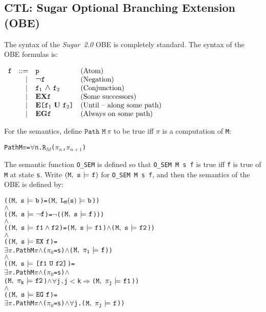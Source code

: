 \documentclass{llncs}
\newcommand{\And}{\(\wedge\)}
\newcommand{\Imp}{\(\Rightarrow\)}
\newcommand{\Not}{\(\neg\)}
\newcommand{\Forall}{\(\forall\)}
\newcommand{\Exists}{\(\exists\)}
\newcommand{\Le}{\(<\)}
\renewcommand{\Pi}{\(\pi\)}
\newcommand{\BSem}[3]{(\(\tt#1,~#2~{\models}~#3\))}
\newcommand{\OSem}[3]{(\(\tt{#1,~#2~{\models}~#3}\))}
\newcommand{\Osem}{\texttt{O\_SEM}\xspace}
\newcommand{\oSem}[3]{(\tt{#1,~#2~{\models}~#3})}
\newcommand{\pathEl}[2]{#1_{#2}}
\newcommand{\PathEl}[2]{\(#1_{#2}\)}
\newcommand{\lNoHat}[1]{{\texttt{L}}_{#1}}
\newcommand{\getR}[1]{\({\texttt{R}}_{#1}\)}
\newcommand{\oBool}[1]{#1}
\newcommand{\oNot}[1]{\neg#1}
\newcommand{\oAnd}[2]{#1\wedge#2}
\newcommand{\oEx}[1]{{\texttt{EX}}~#1}
\newcommand{\oEg}[1]{{\texttt{EG}}~#1}
\newcommand{\oEu}[2]{\texttt{[}#1~{\texttt{U}}~#2\texttt{]}}
\newcommand\Sugar{{\it{Sugar~2.0}}\xspace}
\renewcommand{\t}[1]{\texttt{#1}}
\newcommand{\TLNot}{\mbox{\large\bf$\neg$}}
\newcommand{\TLAnd}{\mbox{\large\bf$\wedge$}}
\newcommand{\lsb}{\texttt{[}}
\newcommand{\rsb}{\texttt{]}}
\begin{document}
\subsection{CTL: Sugar Optional Branching Extension (OBE)}\label{OBEfinite}

The syntax of the \Sugar OBE is completely standard. The syntax of
the OBE formulas is:

\medskip


$\begin{array}{ccll}

{\t{f}} & {\rm ::=} & \t{p}
  & \mbox{\rm(Atom)}\\

 & \phantom{\rm ::}\mid & \TLNot{\t{f}}
  & \mbox{\rm(Negation)}\\

 & \phantom{\rm ::}\mid & {\t{f}}_1~\TLAnd~{\t{f}}_2
  & \mbox{\rm(Conjunction)}\\

 & \phantom{\rm ::}\mid & {\bf{EX}}{\t{f}}
  & \mbox{\rm(Some successors)}\\

 & \phantom{\rm ::}\mid & {\bf{E}}{\lsb}{\t{f}}_1~{\bf{U}}~{\t{f}}_2{\rsb}
  & \mbox{\rm(Until -- along some path)}\\

 & \phantom{\rm ::}\mid & {\bf{EG}}{\t{f}}
  & \mbox{\rm(Always on some path)}\\

\end{array}$

\medskip

For the semantics, define $\texttt{Path~M}~\pi$ to be true iff $\pi$ is a computation of \texttt{M}:

{\begin{alltt}
   Path M {\Pi} = {\Forall}n. \getR{M}(\PathEl{{\pi}}{n}, \PathEl{{\pi}}{n+1})
\end{alltt}}


The semantic function \Osem is defined so that
\texttt{\Osem~M~s~f} is true iff \texttt{f} is true of \texttt{M} at
state \texttt{s}.
Write $\oSem{M}{s}{f}$ for \texttt{\Osem~M~s~f}, and then the semantics of the OBE is defined by:

{\begin{alltt}
   (\OSem{M}{s}{\oBool{b}} = {\BSem{M}{\lNoHat{M}(s)}{b}})
   {\And}
   (\OSem{M}{s}{\oNot{f}} = {\Not}(\OSem{M}{s}{f})) 
   {\And}
   (\OSem{M}{s}{\oAnd{f1}{f2}} = \OSem{M}{s}{f1} {\And} \OSem{M}{s}{f2})
   {\And}
   (\OSem{M}{s}{\oEx{f}} = 
     {\Exists}{\Pi}. Path M {\Pi} {\And} (\PathEl{{\pi}}{0} = s) {\And} \OSem{M}{\pathEl{{\pi}}{1}}{f})
   {\And}
   (\OSem{M}{s}{\oEu{f1}{f2}} = 
     {\Exists}{\Pi}. Path M {\Pi} {\And} (\PathEl{{\pi}}{0} = s) \And
         \OSem{M}{\pathEl{{\pi}}{k}}{f2} {\And} {\Forall}j. j {\Le} k {\Imp} \OSem{M}{\pathEl{{\pi}}{j}}{f1})
   {\And}
   (\OSem{M}{s}{\oEg{f}} = 
     {\Exists}{\Pi}. Path M {\Pi} {\And} (\PathEl{{\pi}}{0} = s) {\And} {\Forall}j. \OSem{M}{\pathEl{{\pi}}{j}}{f})
\end{alltt}}
\end{document}
